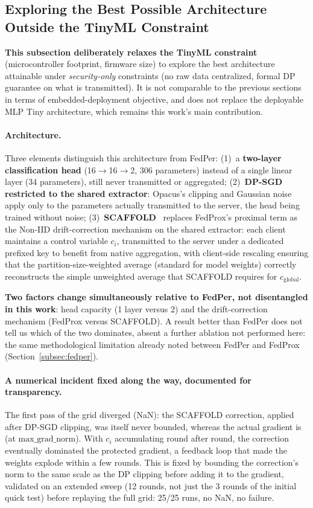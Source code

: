 \documentclass{article}
\begin{document}
\subsection{Exploring the Best Possible Architecture Outside the TinyML
Constraint}
\label{subsec:fedrep_scaffold}

\textbf{This subsection deliberately relaxes the TinyML constraint} (microcontroller
footprint, firmware size) to explore the best architecture attainable under
\emph{security-only} constraints (no raw data centralized, formal DP guarantee on
what is transmitted). It is not comparable to the previous sections in terms of
embedded-deployment objective, and does not replace the deployable MLP Tiny
architecture, which remains this work's main contribution.

\paragraph{Architecture.} Three elements distinguish this architecture from
FedPer: (1)~a \textbf{two-layer classification head} (16$\to$16$\to$2, 306
parameters) instead of a single linear layer (34 parameters), still never
transmitted or aggregated; (2)~\textbf{DP-SGD restricted to the shared
extractor}: Opacus's clipping and Gaussian noise apply only to the parameters
actually transmitted to the server, the head being trained without noise;
(3)~\textbf{SCAFFOLD}~\cite{karimireddy2020scaffold} replaces FedProx's proximal
term as the Non-IID drift-correction mechanism on the shared extractor: each
client maintains a control variable $c_i$, transmitted to the server under a
dedicated prefixed key to benefit from native aggregation, with client-side
rescaling ensuring that the partition-size-weighted average (standard for model
weights) correctly reconstructs the simple unweighted average that SCAFFOLD
requires for $c_{\text{global}}$.

\textbf{Two factors change simultaneously relative to FedPer, not disentangled in
this work}: head capacity (1 layer versus 2) and the drift-correction mechanism
(FedProx versus SCAFFOLD). A result better than FedPer does not tell us which of
the two dominates, absent a further ablation not performed here: the same
methodological limitation already noted between FedPer and FedProx
(Section~\ref{subsec:fedper}).

\paragraph{A numerical incident fixed along the way, documented for
transparency.} The first pass of the grid diverged (NaN): the SCAFFOLD
correction, applied after DP-SGD clipping, was itself never bounded, whereas the
actual gradient is (at $\text{max\_grad\_norm}$). With $c_i$ accumulating round
after round, the correction eventually dominated the protected gradient, a
feedback loop that made the weights explode within a few rounds. This is fixed by
bounding the correction's norm to the same scale as the DP clipping before adding
it to the gradient, validated on an extended sweep (12 rounds, not just the 3
rounds of the initial quick test) before replaying the full grid: 25/25 runs, no
NaN, no failure.
\end{document}
